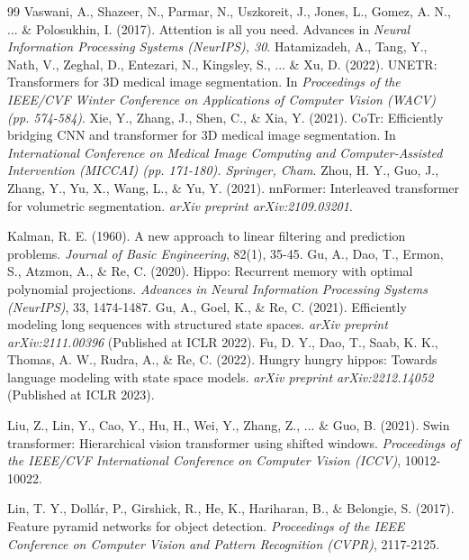 \documentclass[runningheads]{llncs}
\begin{document}
\begin{thebibliography}{99}
Vaswani, A., Shazeer, N., Parmar, N., Uszkoreit, J., Jones, L., Gomez, A. N., ... \& Polosukhin, I. (2017). Attention is all you need. Advances in \textit{Neural Information Processing Systems (NeurIPS), 30}. 
Hatamizadeh, A., Tang, Y., Nath, V., Zeghal, D., Entezari, N., Kingsley, S., ... \& Xu, D. (2022). UNETR: Transformers for 3D medical image segmentation. In \textit{Proceedings of the IEEE/CVF Winter Conference on Applications of Computer Vision (WACV) (pp. 574-584)}. 
Xie, Y., Zhang, J., Shen, C., \& Xia, Y. (2021). CoTr: Efficiently bridging CNN and transformer for 3D medical image segmentation. In \textit{International Conference on Medical Image Computing and Computer-Assisted Intervention (MICCAI) (pp. 171-180). Springer, Cham}. 
Zhou, H. Y., Guo, J., Zhang, Y., Yu, X., Wang, L., \& Yu, Y. (2021). nnFormer: Interleaved transformer for volumetric segmentation. \textit{arXiv preprint arXiv:2109.03201}. 

Kalman, R. E. (1960). A new approach to linear filtering and prediction problems. \textit{Journal of Basic Engineering}, 82(1), 35-45.
Gu, A., Dao, T., Ermon, S., Atzmon, A., \& Re, C. (2020). Hippo: Recurrent memory with optimal polynomial projections. \textit{Advances in Neural Information Processing Systems (NeurIPS)}, 33, 1474-1487.
Gu, A., Goel, K., \& Re, C. (2021). Efficiently modeling long sequences with structured state spaces. \textit{arXiv preprint arXiv:2111.00396} (Published at ICLR 2022).
Fu, D. Y., Dao, T., Saab, K. K., Thomas, A. W., Rudra, A., \& Re, C. (2022). Hungry hungry hippos: Towards language modeling with state space models. \textit{arXiv preprint arXiv:2212.14052} (Published at ICLR 2023).






Liu, Z., Lin, Y., Cao, Y., Hu, H., Wei, Y., Zhang, Z., ... \& Guo, B. (2021). Swin transformer: Hierarchical vision transformer using shifted windows. \textit{Proceedings of the IEEE/CVF International Conference on Computer Vision (ICCV)}, 10012-10022.

Lin, T. Y., Dollár, P., Girshick, R., He, K., Hariharan, B., \& Belongie, S. (2017). Feature pyramid networks for object detection. \textit{Proceedings of the IEEE Conference on Computer Vision and Pattern Recognition (CVPR)}, 2117-2125.


\end{thebibliography}
\end{document}
